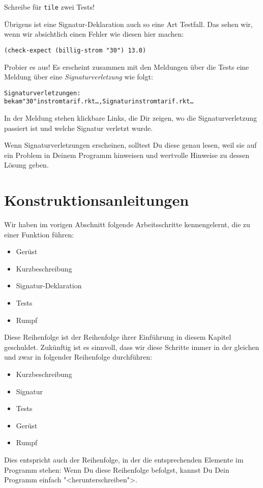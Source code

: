 \begin{aufgabeinline}
  Schreibe für \lstinline{tile} zwei Tests!
\end{aufgabeinline}
%
Übrigens ist eine Signatur-Deklaration auch so eine Art Testfall.
Das sehen wir, wenn wir absichtlich einen Fehler wie diesen hier
machen:
%
\begin{lstlisting}
(check-expect (billig-strom "30") 13.0)
\end{lstlisting}
%
Probier es aus!  Es erscheint zusammen mit den Meldungen über die
Tests eine Meldung über eine
\textit{Signaturverletzung} wie folgt:
%
\begin{alltt}
Signaturverletzungen:
	bekam "30" in stromtarif.rkt \ldots, Signatur in stromtarif.rkt \ldots
\end{alltt}
%
In der Meldung stehen klickbare Links, die Dir zeigen, wo die
Signaturverletzung passiert ist und welche Signatur verletzt wurde.

Wenn Signaturverletzungen erscheinen, solltest Du diese genau lesen,
weil sie auf ein Problem in Deinem Programm hinweisen und wertvolle
Hinweise zu dessen Lösung geben.

\section{Konstruktionsanleitungen}
\label{sec:konstruktionsanleitungen}
%
Wir haben im vorigen Abschnitt folgende Arbeitsschritte kennengelernt,
die zu einer Funktion führen:
%
\begin{itemize}
\item Gerüst
\item Kurzbeschreibung
\item Signatur-Deklaration
\item Tests
\item Rumpf
\end{itemize}
%
Diese Reihenfolge ist der Reihenfolge ihrer Einführung in diesem
Kapitel geschuldet.  Zukünftig ist es sinnvoll, dass wir diese Schritte
immer in der gleichen und zwar in folgender Reihenfolge durchführen:
%
\begin{itemize}
\item Kurzbeschreibung
\item Signatur
\item Tests
\item Gerüst
\item Rumpf
\end{itemize}
%
Dies entspricht auch der Reihenfolge, in der die entsprechenden
Elemente im Programm stehen: Wenn Du diese Reihenfolge befolgst,
kannst Du Dein Programm einfach "<herunterschreiben">.

